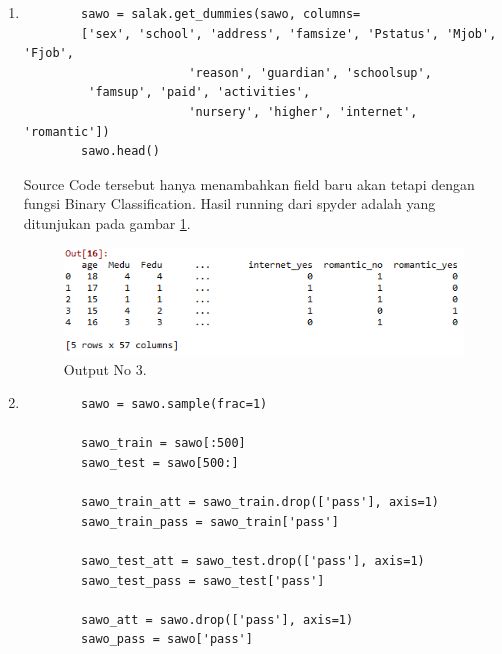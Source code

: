 \begin{enumerate}
		\item
	\begin{verbatim}
		sawo = salak.get_dummies(sawo, columns=
		['sex', 'school', 'address', 'famsize', 'Pstatus', 'Mjob', 'Fjob', 
                       'reason', 'guardian', 'schoolsup',
		 'famsup', 'paid', 'activities',
                       'nursery', 'higher', 'internet', 'romantic'])
		sawo.head()
	\end{verbatim}
	\subitem Source Code tersebut hanya menambahkan field baru akan tetapi dengan fungsi Binary Classification. Hasil running dari 			    spyder adalah yang ditunjukan pada gambar \ref{YNO3}.

	\begin{figure}[ht]
		\centerline{\includegraphics[width=1\textwidth]{figures/YN/YNBerhasil3.png}}
		\caption{Output No 3.}
		\label{YNO3}
	\end{figure}

		\item
	\begin{verbatim}
		sawo = sawo.sample(frac=1)

		sawo_train = sawo[:500]
		sawo_test = sawo[500:]

		sawo_train_att = sawo_train.drop(['pass'], axis=1)
		sawo_train_pass = sawo_train['pass']

		sawo_test_att = sawo_test.drop(['pass'], axis=1)
		sawo_test_pass = sawo_test['pass']

		sawo_att = sawo.drop(['pass'], axis=1)
		sawo_pass = sawo['pass']


\end{verbatim}
\end{enumerate}
